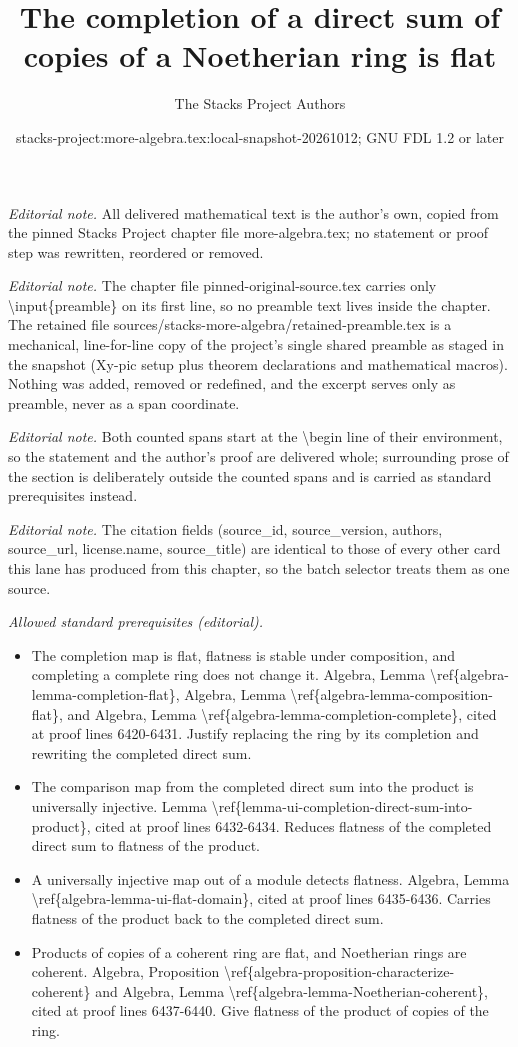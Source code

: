 \documentclass[10pt,a4paper]{amsart}
\title{The completion of a direct sum of copies of a Noetherian ring is flat}
\author{The Stacks Project Authors}
\date{stacks-project:more-algebra.tex:local-snapshot-20261012; GNU FDL 1.2 or later}
\theoremstyle{plain}
\theoremstyle{definition}
\theoremstyle{remark}
\numberwithin{equation}{subsection}
\begin{document}
\maketitle
\setcounter{subsection}{1}
\noindent\textit{Editorial note.} All delivered mathematical text is the author's own, copied from the pinned Stacks Project chapter file more-algebra.tex; no statement or proof step was rewritten, reordered or removed.\par\medskip
\noindent\textit{Editorial note.} The chapter file pinned-original-source.tex carries only \textbackslash{}input\{preamble\} on its first line, so no preamble text lives inside the chapter. The retained file sources/stacks-more-algebra/retained-preamble.tex is a mechanical, line-for-line copy of the project's single shared preamble as staged in the snapshot (Xy-pic setup plus theorem declarations and mathematical macros). Nothing was added, removed or redefined, and the excerpt serves only as preamble, never as a span coordinate.\par\medskip
\noindent\textit{Editorial note.} Both counted spans start at the \textbackslash{}begin line of their environment, so the statement and the author's proof are delivered whole; surrounding prose of the section is deliberately outside the counted spans and is carried as standard prerequisites instead.\par\medskip
\noindent\textit{Editorial note.} The citation fields (source\_id, source\_version, authors, source\_url, license.name, source\_title) are identical to those of every other card this lane has produced from this chapter, so the batch selector treats them as one source.\par\medskip
\noindent\textit{Allowed standard prerequisites (editorial).}\begin{itemize}
\item The completion map is flat, flatness is stable under composition, and completing a complete ring does not change it. Algebra, Lemma \textbackslash{}ref\{algebra-lemma-completion-flat\}, Algebra, Lemma \textbackslash{}ref\{algebra-lemma-composition-flat\}, and Algebra, Lemma \textbackslash{}ref\{algebra-lemma-completion-complete\}, cited at proof lines 6420-6431. Justify replacing the ring by its completion and rewriting the completed direct sum.
\item The comparison map from the completed direct sum into the product is universally injective. Lemma \textbackslash{}ref\{lemma-ui-completion-direct-sum-into-product\}, cited at proof lines 6432-6434. Reduces flatness of the completed direct sum to flatness of the product.
\item A universally injective map out of a module detects flatness. Algebra, Lemma \textbackslash{}ref\{algebra-lemma-ui-flat-domain\}, cited at proof lines 6435-6436. Carries flatness of the product back to the completed direct sum.
\item Products of copies of a coherent ring are flat, and Noetherian rings are coherent. Algebra, Proposition \textbackslash{}ref\{algebra-proposition-characterize-coherent\} and Algebra, Lemma \textbackslash{}ref\{algebra-lemma-Noetherian-coherent\}, cited at proof lines 6437-6440. Give flatness of the product of copies of the ring.
\end{itemize}\medskip
\end{document}

